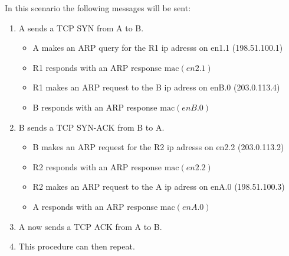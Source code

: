 \documentclass[a4paper,10pt]{article}
\begin{document}
In this scenario the following messages will be sent:
\begin{enumerate}
  \item A sends a TCP SYN from A to B.
  \begin{itemize}
    \item A makes an ARP query for the R1 ip adresss on en1.1 (198.51.100.1)
    \item R1 responds with an ARP response $\text{mac}(en2.1)$
    \item R1 makes an ARP request to the B ip adress on enB.0 (203.0.113.4)
    \item B responds with an ARP response $\text{mac}(enB.0)$
  \end{itemize}
  \item B sends a TCP SYN-ACK from B to A.
  \begin{itemize}
    \item B makes an ARP request for the R2 ip adresss on en2.2 (203.0.113.2)
    \item R2 responds with an ARP response $\text{mac}(en2.2)$
    \item R2 makes an ARP request to the A ip adress on enA.0 (198.51.100.3)
    \item A responds with an ARP response $\text{mac}(enA.0)$
  \end{itemize}
  \item A now sends a TCP ACK from A to B.
  \item This procedure can then repeat.
\end{enumerate}
\end{document}
